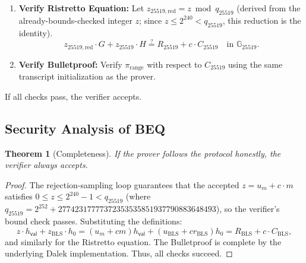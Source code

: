 \documentclass[11pt]{article}
\theoremstyle{definitionstyle}
\newtheorem{theorem}{Theorem}[section]
\theoremstyle{plain}
\begin{document}
\begin{enumerate}[leftmargin=*]
\item \textbf{Verify Ristretto Equation:}
  Let $z_{25519,\text{red}} = z \bmod q_{25519}$ (derived from the already-bounds-checked integer $z$; since $z \le 2^{240} < q_{25519}$, this reduction is the identity).
  \[
  z_{25519,\text{red}} \cdot G + z_{25519} \cdot H \stackrel{?}{=} R_{25519} + c \cdot C_{25519} \quad \text{in } \mathbb{G}_{25519}.
  \]

\item \textbf{Verify Bulletproof:}
  Verify $\pi_{\text{range}}$ with respect to $C_{25519}$ using the same transcript initialization as the prover.
\end{enumerate}

If all checks pass, the verifier accepts.

\subsection{Security Analysis of BEQ}

\begin{theorem}[Completeness]
If the prover follows the protocol honestly, the verifier always accepts.
\end{theorem}
\begin{proof}
The rejection-sampling loop guarantees that the accepted $z = u_m + c \cdot m$ satisfies $0 \le z \le 2^{240}-1 < q_{25519}$ (where $q_{25519} = 2^{252} + 27742317777372353535851937790883648493$), so the verifier's bound check passes. Substituting the definitions:
\[
z \cdot h_{\mathsf{val}} + z_{\text{BLS}} \cdot h_0 = (u_m + c m) h_{\mathsf{val}} + (u_{\text{BLS}} + c r_{\text{BLS}}) h_0 = R_{\text{BLS}} + c \cdot C_{\text{BLS}},
\]
and similarly for the Ristretto equation. The Bulletproof is complete by the underlying Dalek implementation. Thus, all checks succeed.
\end{proof}
\end{document}
